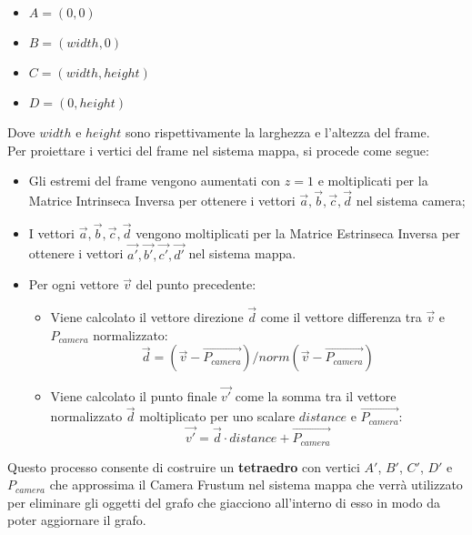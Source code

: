 \begin{itemize}
  \item $A = (0, 0)$
  \item $B = (width, 0)$
  \item $C = (width, height)$
  \item $D = (0, height)$
\end{itemize}
Dove $width$ e $height$ sono rispettivamente la larghezza e l'altezza del frame.\\
Per proiettare i vertici del frame nel sistema mappa, si procede come segue:
\begin{itemize}
  \item Gli estremi del frame vengono aumentati con $z=1$ e moltiplicati per la Matrice Intrinseca Inversa per ottenere i vettori $\vec{a}, \vec{b}, \vec{c}, \vec{d}$ nel sistema camera;
  \item I vettori $\vec{a}, \vec{b}, \vec{c}, \vec{d}$ vengono moltiplicati per la Matrice Estrinseca Inversa per ottenere i vettori $\vec{a'}, \vec{b'}, \vec{c'}, \vec{d'}$ nel sistema mappa.
  \item Per ogni vettore $\vec{v}$ del punto precedente:
        \begin{itemize}
          \item Viene calcolato il vettore direzione $\vec{d}$ come il vettore differenza tra $\vec{v}$ e $P_{camera}$ normalizzato:
                \begin{equation}
                  \vec{d} = (\vec{v} - \overrightarrow{P_{camera}})/norm(\vec{v} - \overrightarrow{P_{camera}})
                \end{equation}
          \item Viene calcolato il punto finale $\vec{v'}$ come la somma tra il vettore normalizzato $\vec{d}$ moltiplicato per uno scalare $distance$ e $\overrightarrow{P_{camera}}$:
                \begin{equation}
                  \vec{v'} = \vec{d} \cdot distance + \overrightarrow{P_{camera}}
                \end{equation}
        \end{itemize}
\end{itemize}
Questo processo consente di costruire un \textbf{tetraedro} con vertici $A'$, $B'$, $C'$, $D'$ e $P_{camera}$ che approssima il Camera Frustum nel sistema mappa che verrà utilizzato per eliminare gli oggetti del grafo che giacciono all'interno di esso in modo da poter aggiornare il grafo.

